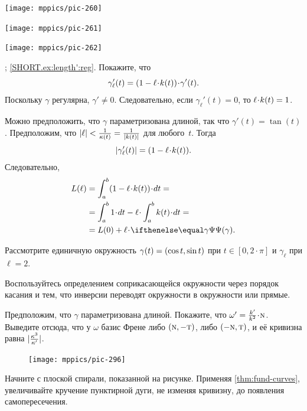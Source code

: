 \begin{multicols}{2}
\begin{Figure}
\begin{minipage}{.27\textwidth}
\centering
\texttt{[image: mppics/pic-260]}
\end{minipage}\hfill
\begin{minipage}{.42\textwidth}
\centering
\texttt{[image: mppics/pic-261]}
\end{minipage}
\hfill
\begin{minipage}{.27\textwidth}
\centering
\texttt{[image: mppics/pic-262]}
\end{minipage}
\end{Figure}

\parbf{\ref{ex:length'}}; \ref{SHORT.ex:length':reg}.
Покажите, что
\[
\gamma_\ell'(t)=(1-\ell\cdot\skur(t))\cdot \gamma'(t).
\]
Поскольку $\gamma$ регулярна, $\gamma'\ne0$.
Следовательно, если $\gamma_\ell'(t)=0$, то $\ell\cdot \skur(t)= 1$.

Можно предположить, что $\gamma$ параметризована длиной, так что $\gamma'(t)=\tan(t)$.
Предположим, что $|\ell|<\frac{1}{\kappa(t)}=\frac{1}{|k(t)|}$ для любого~$t$.
Тогда 
\[
|\gamma_\ell'(t)|=(1-\ell\cdot\skur(t)).
\]
Следовательно,
\begin{align*}
L(\ell)
&=
\int_a^b(1-\ell\cdot\skur(t))\cdot dt=
\\&=
\int_a^b 1\cdot dt-\ell\cdot \int_a^b\skur(t)\cdot dt=
\\
&=
L(0)+\ell\cdot\tgc\gamma.
\end{align*}

Рассмотрите единичную окружность $\gamma(t)\z=(\cos t,\sin t)$ при $t\in[0,2\cdot\pi]$ и $\gamma_\ell$ при $\ell=2$.

Воспользуйтесь определением соприкасающейся окружности через порядок касания и тем, что инверсии переводят окружности в окружности или прямые.

Предположим, что $\gamma$ параметризована длиной.
Покажите, что $\omega'=\tfrac{\skur'}{\skur^2}\cdot \norm$. 
Выведите отсюда, что у $\omega$ базис Френе либо $(\text{\sc{n}},-\text{\sc{t}})$, либо $(-\text{\sc{n}},\text{\sc{t}})$, и её кривизна равна $|\tfrac{\kappa^3}{\kappa'}|$.

\begin{figure}
\vskip-4mm
\centering
\texttt{[image: mppics/pic-296]}
\vskip-0mm
\end{figure}

Начните с плоской спирали, показанной на рисунке.
Применяя \ref{thm:fund-curves}, увеличивайте кручение пунктирной дуги, не изменяя кривизну, до появления самопересечения.


\end{multicols}
